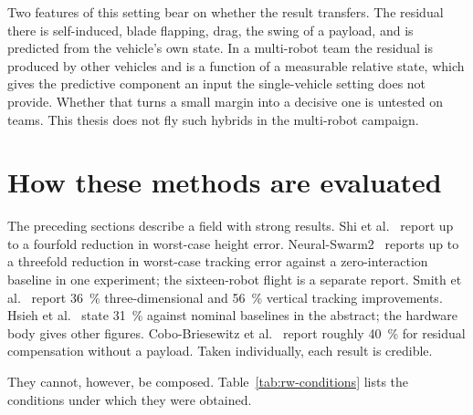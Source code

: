 Two features of this setting bear on whether the result transfers. The residual there is
self-induced, blade flapping, drag, the swing of a payload, and is predicted from the
vehicle's own state. In a multi-robot team the residual is produced by other vehicles and is a
function of a measurable relative state, which gives the predictive component an input the
single-vehicle setting does not provide. Whether that turns a small margin into a decisive one is untested on teams. This thesis does not
fly such hybrids in the multi-robot campaign.

\section{How these methods are evaluated}
\label{sec:rw-eval}

The preceding sections describe a field with strong results. Shi et al.~\cite{shi2020neuralswarm}
report up to a fourfold reduction in worst-case height error. Neural-Swarm2~\cite{shi2022neuralswarm2}
reports up to a threefold reduction in worst-case tracking error against a zero-interaction
baseline in one experiment; the sixteen-robot flight is a separate report.
Smith et al.~\cite{smith2023so2equivariant} report \SI{36}{\percent} three-dimensional and
\SI{56}{\percent} vertical tracking improvements. Hsieh et al.~\cite{hsieh2026flatness} state
\SI{31}{\percent} against nominal baselines in the abstract; the hardware body gives other figures.
Cobo-Briesewitz et al.~\cite{cobobriesewitz2026lindi} report roughly \SI{40}{\percent} for
residual compensation without a payload. Taken individually, each result is credible.

They cannot, however, be composed. Table~\ref{tab:rw-conditions} lists the conditions under which
they were obtained.

